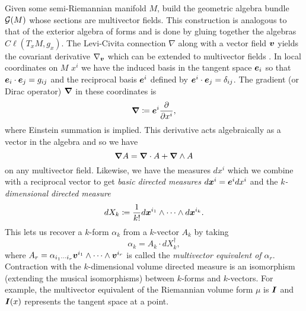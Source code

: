 \documentclass[conf]{new-aiaa}
\begin{document}
Given some semi-Riemannian manifold $M$, build the geometric algebra bundle $\mathcal{G}(M)$ whose sections are multivector fields. This construction is analogous to that of the exterior algebra of forms and is done by gluing together the algebras $C\ell(T_xM,g_x)$.  The Levi-Civita connection $\nabla$ along with a vector field $\boldsymbol{v}$ yields the covariant derivative $\nabla_{\boldsymbol{v}}$ which can be extended to multivector fields \cite{schindler_geometric_2020}. In local coordinates on $M$ $x^i$ we have the induced basis in the tangent space $\boldsymbol{e}_i$ so that $\boldsymbol{e}_i\cdot \boldsymbol{e}_j = g_{ij}$ and the reciprocal basis $\boldsymbol{e}^i$ defined by $\boldsymbol{e}^i\cdot \boldsymbol{e}_j = \delta_{ij}$. The gradient (or Dirac operator) $\boldsymbol{\nabla}$ in these coordinates is
\begin{equation}
    \boldsymbol{\nabla} \coloneqq \boldsymbol{e}^i \frac{\partial}{\partial x^i},
\end{equation}
where Einstein summation is implied. This derivative acts algebraically as a vector in the algebra and so we have
\begin{equation}
\boldsymbol{\nabla} A = \boldsymbol{\nabla} \cdot A + \boldsymbol{\nabla} \wedge A
\end{equation}
on any multivector field. Likewise, we have the measures $dx^i$ which we combine with a reciprocal vector to get \emph{basic directed measures} $d\boldsymbol{x}^i = \boldsymbol{e}^i dx^i$ and the \emph{$k$-dimensional directed measure}
\begin{equation}
    dX_k \coloneqq \frac{1}{k!} d\boldsymbol{x}^{i_1}\wedge \cdots \wedge d\boldsymbol{x}^{i_k}.
\end{equation}
This lets us recover a $k$-form $\alpha_k$ from a $k$-vector $A_k$ by taking
\begin{equation}
\alpha_k = A_k \cdot dX_k^\dagger,
\end{equation}
where $A_r = \alpha_{i_1 \cdots i_r} \boldsymbol{v}^{i_1} \wedge \cdots \wedge \boldsymbol{v}^{i_r}$ is called the \emph{multivector equivalent of $\alpha_r$}. Contraction with the $k$-dimensional volume directed measure is an isomorphism (extending the musical isomorphisms) between $k$-forms and $k$-vectors. For example, the multivector equivalent of the Riemannian volume form $\mu$ is $\boldsymbol{I}$ and $\boldsymbol{I}(x)$ represents the tangent space at a point. 
\end{document}
